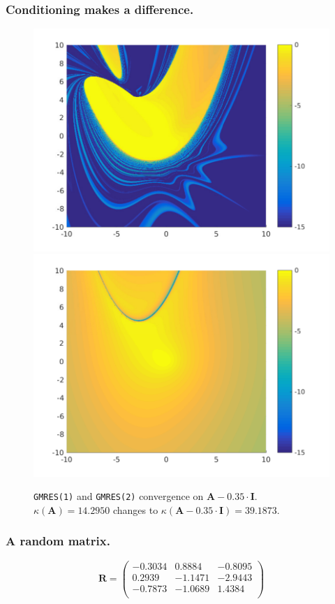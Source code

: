 \begin{frame}
\frametitle{Conditioning makes a difference.}
	\begin{figure}
	\centering
	\includegraphics[width=0.45\linewidth]{../images/Am0p35eyeGMRES1}
	\includegraphics[width=0.45\linewidth]{../images/Am0p35eyeGMRES2}
	\caption{\texttt{GMRES(1)} and \texttt{GMRES(2)} convergence on $\mathbf{A} - 0.35 \cdot \mathbf{I}$. $\kappa(\mathbf{A}) = 14.2950$ changes to $\kappa(\mathbf{A} - 0.35 \cdot \mathbf{I}) = 39.1873$.} 
	\label{fig:modA}
	\end{figure}
\end{frame}

\begin{frame}
\frametitle{A random matrix.}
\begin{equation}
\mathbf{R} = \begin{pmatrix}
-0.3034 &   0.8884 &  -0.8095 \\
 0.2939 &  -1.1471 &  -2.9443 \\
-0.7873 &  -1.0689 &   1.4384 \\
\end{pmatrix} 
\end{equation}
\end{frame}

